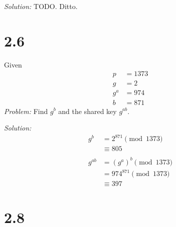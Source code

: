 \documentclass[12pt]{article}
\begin{document}
\textit{Solution:} TODO. Ditto.

\section*{2.6}
Given
\begin{align*}
    p &= 1373 \\
    g &= 2 \\
    g^a &= 974 \\
    b &= 871
\end{align*}
\textit{Problem:} Find $g^b$ and the shared key $g^{ab}$.

\textit{Solution:}
\begin{align*}
    g^b &= 2^{871} \pmod{1373} \\
    &\equiv \boxed{805} \\
    \\
    g^{ab} &= (g^a)^b \pmod{1373} \\
    &= 974^{871} \pmod{1373} \\
    &\equiv \boxed{397}
\end{align*}

\section*{2.8}
\end{document}
